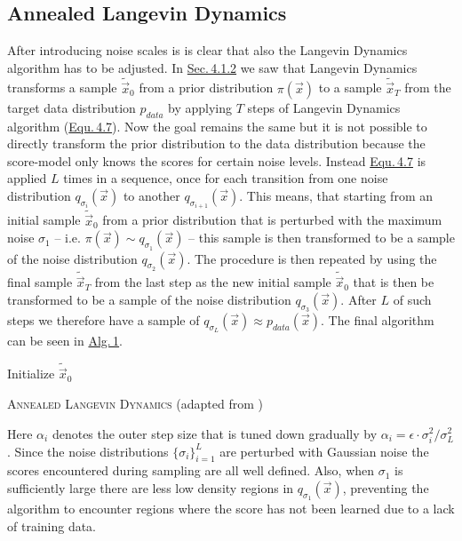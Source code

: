 \subsection{Annealed Langevin Dynamics} \label{4.3.2}
After introducing noise scales is is clear that also the Langevin Dynamics algorithm has to be adjusted. In \hyperref[sec:4.1.2]{Sec.\,4.1.2} we saw that Langevin Dynamics transforms a sample $\tilde{\vec{x}}_0$ from a prior distribution $\pi(\vec{x})$ to a sample $\tilde{\vec{x}}_T$ from the target data distribution $p_{data}$ by applying $T$ steps of Langevin Dynamics algorithm (\hyperref[equ:4.7]{Equ.\,4.7}). Now the goal remains the same but it is not possible to directly transform the prior distribution to the data distribution because the score-model only knows the scores for certain noise levels. Instead \hyperref[equ:4.7]{Equ.\,4.7} is applied $L$ times in a sequence, once for each transition from one noise distribution $q_{\sigma_i}(\vec{x})$ to another $q_{\sigma_{i+1}}(\vec{x})$. This means, that starting from an initial sample $\tilde{\vec{x}}_0$ from a prior distribution that is perturbed with the maximum noise $\sigma_1$ – i.e. $\pi(\vec{x})\sim q_{\sigma_1}(\vec{x})$ – this sample is then transformed to be a sample of the noise distribution $q_{\sigma_{2}}(\vec{x})$. The procedure is then repeated by using the final sample $\tilde{\vec{x}}_T$ from the last step as the new initial sample $\tilde{\vec{x}}_0$ that is then be transformed to be a sample of the noise distribution $q_{\sigma_{3}}(\vec{x})$. After $L$ of such steps we therefore have a sample of $q_{\sigma_L}(\vec{x})\approx p_{data}(\vec{x})$. The final algorithm can be seen in \hyperref[alg:1]{Alg.\,1}.
%
\begin{algorithm} \label{alg:1}
    \DontPrintSemicolon
    Initialize $\tilde{\vec{x}}_0$\;
    \caption[Annealed Langevin Dynamics]{\textsc{Annealed Langevin Dynamics} (adapted from \cite{score_1})}
\end{algorithm}

Here $\alpha_i$ denotes the outer step size that is tuned down gradually by $\alpha_i=\epsilon\cdot\sigma_i^2/\sigma_L^2$. Since the noise distributions $\{\sigma_i\}_{i=1}^L$ are perturbed with Gaussian noise the scores encountered during sampling are all well defined. Also, when $\sigma_1$ is sufficiently large there are less low density regions in $q_{\sigma_1}(\vec{x})$, preventing the algorithm to encounter regions where the score has not been learned due to a lack of training data.

